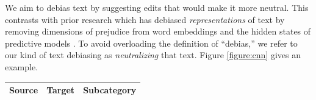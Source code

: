 We aim to debias text by suggesting edits that would make it more neutral. This contrasts with prior research which has debiased \emph{representations} of text by removing dimensions of prejudice from word embeddings \cite{bolukbasi2016man,gonen2019lipstick,ethayarajh2019understanding} and the hidden states of predictive models \cite{zhao2018gender,das2018mitigating}. To avoid overloading the definition of ``debias,'' we  refer to our kind of text debiasing as \emph{neutralizing} that text. Figure \ref{figure:cnn} gives an example. 


 


\begin{table}[ht]
\small
\centering
\begin{tabular}{lll}
\textbf{Source}                                     & \textbf{Target}        & \textbf{Subcategory}                             \\ \hline \hline


\end{tabular}
\end{table}
